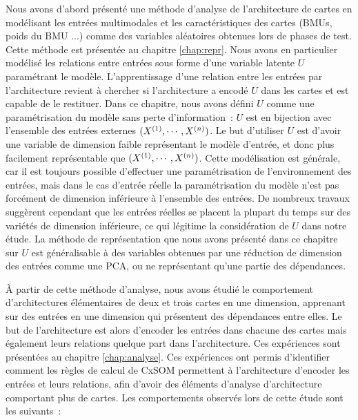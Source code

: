 Nous avons d'abord présenté une méthode d'analyse de l'architecture de cartes en modélisant les entrées multimodales et les caractéristiques des cartes (BMUs, poids du BMU ...) comme des variables aléatoires obtenues lors de phases de test. Cette méthode est présentée au chapitre \ref{chap:repr}.
Nous avons en particulier modélisé les relations entre entrées sous forme d'une variable latente $U$ paramétrant le modèle. L'apprentissage d'une relation entre les entrées par l'architecture revient à chercher si l'architecture a encodé $U$ dans les cartes et est capable de le restituer.
Dans ce chapitre, nous avons défini $U$ comme une paramétrisation du modèle sans perte d'information~: $U$ est en bijection avec l'ensemble des entrées externes $(X^{({1})}, \cdots, X^{({n})})$. Le but d'utiliser $U$ est d'avoir une variable de dimension faible représentant le modèle d'entrée, et donc plus facilement représentable que $(X^{({1})}, \cdots, X^{({n})})$.
Cette modélisation est générale, car il est toujours possible d'effectuer une paramétrisation de l'environnement des entrées, mais dans le cas d'entrée réelle la paramétrisation du modèle n'est pas forcément de dimension inférieure à l'ensemble des entrées.
De nombreux travaux suggèrent cependant que les entrées réelles se placent la plupart du temps sur des variétés de dimension inférieure, ce qui légitime la considération de $U$ dans notre étude.
La méthode de représentation que nous avons présenté dans ce chapitre sur $U$ est généralisable à des variables obtenues par une réduction de dimension des entrées comme une PCA, ou ne représentant qu'une partie des dépendances.

\`A partir de cette méthode d'analyse, nous avons étudié le comportement d'architectures élémentaires de deux et trois cartes en une dimension, apprenant sur des entrées en une dimension qui présentent des dépendances entre elles. 
Le but de l'architecture est alors d'encoder les entrées dans chacune des cartes mais également leurs relations quelque part dans l'architecture.
Ces expériences sont présentées au chapitre \ref{chap:analyse}.
Ces expériences ont permis d'identifier comment les règles de calcul de CxSOM permettent à l'architecture d'encoder les entrées et leurs relations, afin d'avoir des éléments d'analyse d'architecture comportant plus de cartes.
Les comportements observés lors de cette étude sont les suivants~: 

